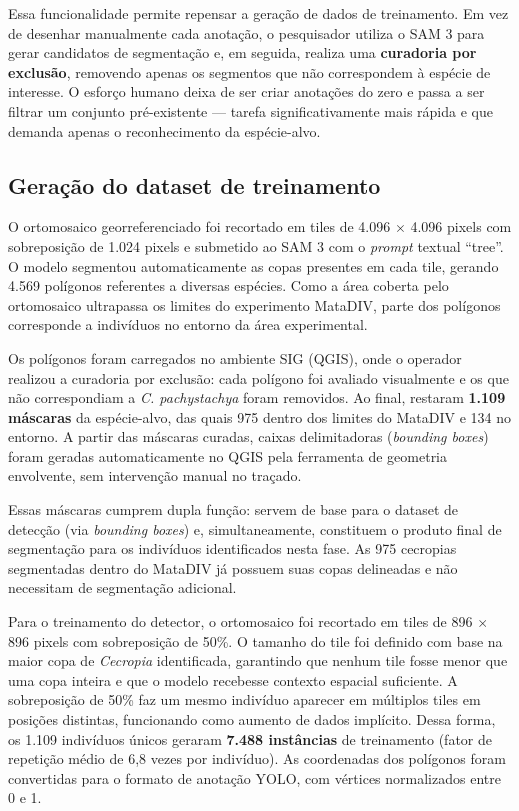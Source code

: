 \documentclass[12pt, a4paper]{article}
\begin{document}
Essa funcionalidade permite repensar a geração de dados de treinamento. Em vez de
desenhar manualmente cada anotação, o pesquisador utiliza o SAM 3 para gerar
candidatos de segmentação e, em seguida, realiza uma \textbf{curadoria por
exclusão}, removendo apenas os segmentos que não correspondem à espécie de
interesse. O esforço humano deixa de ser criar anotações do zero e passa a ser
filtrar um conjunto pré-existente — tarefa significativamente mais rápida e que
demanda apenas o reconhecimento da espécie-alvo.

\subsection{Geração do dataset de treinamento}

O ortomosaico georreferenciado foi recortado em tiles de 4.096 $\times$ 4.096
pixels com sobreposição de 1.024 pixels e submetido ao SAM 3 com o \textit{prompt}
textual ``tree''. O modelo segmentou automaticamente as copas presentes em cada
tile, gerando 4.569 polígonos referentes a diversas espécies. Como a área coberta
pelo ortomosaico ultrapassa os limites do experimento MataDIV, parte dos polígonos
corresponde a indivíduos no entorno da área experimental.

Os polígonos foram carregados no ambiente SIG (QGIS), onde o operador realizou a
curadoria por exclusão: cada polígono foi avaliado visualmente e os que não
correspondiam a \textit{C. pachystachya} foram removidos. Ao final, restaram
\textbf{1.109 máscaras} da espécie-alvo, das quais 975 dentro dos limites do
MataDIV e 134 no entorno. A partir das máscaras curadas, caixas delimitadoras
(\textit{bounding boxes}) foram geradas automaticamente no QGIS pela ferramenta de
geometria envolvente, sem intervenção manual no traçado.

Essas máscaras cumprem dupla função: servem de base para o dataset de detecção
(via \textit{bounding boxes}) e, simultaneamente, constituem o produto final de
segmentação para os indivíduos identificados nesta fase. As 975 cecropias
segmentadas dentro do MataDIV já possuem suas copas delineadas e não necessitam de
segmentação adicional.

Para o treinamento do detector, o ortomosaico foi recortado em tiles de 896
$\times$ 896 pixels com sobreposição de 50\%. O tamanho do tile foi definido com
base na maior copa de \textit{Cecropia} identificada, garantindo que nenhum tile
fosse menor que uma copa inteira e que o modelo recebesse contexto espacial
suficiente. A sobreposição de 50\% faz um mesmo indivíduo aparecer em múltiplos
tiles em posições distintas, funcionando como aumento de dados implícito. Dessa
forma, os 1.109 indivíduos únicos geraram \textbf{7.488 instâncias} de treinamento
(fator de repetição médio de 6,8 vezes por indivíduo). As coordenadas dos polígonos
foram convertidas para o formato de anotação YOLO, com vértices normalizados entre
0 e 1.
\end{document}

